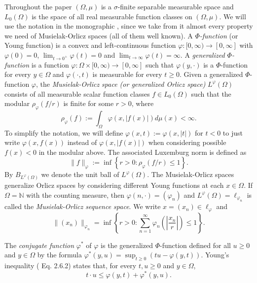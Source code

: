 \documentclass[11pt,a4paper]{amsart}
\newcommand{\lphi}{{L^{\varphi}(\Omega)}}
\begin{document}
Throughout the paper $(\Omega,\mu)$ is a $\sigma$-finite separable measurable space and
$L_{0} (\Omega)$ is the space of all real measurable function
classes on $(\Omega,\mu)$. We will use the notation in the monographic \cite{DHHR}, since we take from it almost every property we need of Musielak-Orlicz spaces (all of them well known).
A {\it $\Phi$-function} (or Young function) is a convex and left-continuous function $\varphi:[0,\infty)\rightarrow [0,\infty]$ with $\varphi(0)=0$, $\lim_{t\rightarrow 0^+}\varphi(t)=0$ and $\lim_{t\rightarrow \infty}\varphi(t)=\infty$. A {\it generalized $\Phi$-function} is a function $\varphi:\Omega\times[0,\infty)\rightarrow[0,\infty]$ such that $\varphi(y,\cdot)$ is a $\Phi$-function for every $y\in\Omega$ and $\varphi(\cdot,t)$ is measurable for every $t\geq 0$. Given a generalized $\Phi$-function $\varphi$, the {\it Musielak-Orlicz space (or generalized Orlicz space)} $\lphi$ consists of all measurable scalar function classes $f \in L_0(\Omega)$ such that the modular $\rho_{\varphi}(f/r)$ is finite for some $r>0$, where
$$
\rho_{\varphi}(f):= \int _{\Omega} \varphi(x,\vert f(x)\vert) d\mu(x) < \infty.
$$
To simplify the notation, we will define $\varphi(x,t):=\varphi(x,\vert t\vert)$ for $t<0$ to just write $\varphi(x,f(x))$ instead of $\varphi(x,\vert f(x)\vert)$ when considering possible $f(x)<0$ in the modular above. The associated Luxemburg norm is defined as
$$
\lVert f\rVert_{\varphi} := \inf \left\{ r>0 : \rho_{\varphi}\left(f/r\right)\leq 1 \right\}.
$$
By $B_{\lphi}$ we denote the unit ball of $\lphi$. The Musielak-Orlicz spaces generalize Orlicz spaces by considering different Young functions at each $x\in\Omega$. 
If $\Omega=\mathbb{N}$ with the counting measure, then $\varphi(n,\cdot)=(\varphi_n)$ and $\lphi=\ell_{\varphi_n}$ is called the {\it Musielak-Orlicz sequence space}. We write $x=(x_n)\in \ell_{\varphi}$ and
$$
\lVert(x_n)\rVert_{\varphi_n}=\inf\left\{ r>0: \sum_{n=1}^{\infty}\varphi_n \left(\left\vert\frac{x_n}{r}\right\vert \right)\leq 1 \right\}.
$$

The {\it conjugate function} $\varphi^*$ of $\varphi$ is the generalized $\Phi$-function defined for all $u\geq 0$ and $y\in\Omega$ by the formula $\varphi^*(y,u)=\sup_{t\geq 0}(tu-\varphi(y,t))$. Young's inequality (\cite{DHHR} Eq. 2.6.2) states that, for every $t,u\geq 0$ and $y\in\Omega$,
\begin{equation}\label{Young-ineq}
    t\cdot u\leq \varphi(y,t)+\varphi^*(y,u).
\end{equation}
\end{document}
